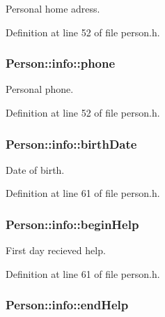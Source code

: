 Personal home adress. 



Definition at line 52 of file person.\+h.

\hypertarget{struct_person_1_1info_a07a8d88e73398595a0e0282eaffe9fef}{
\subsubsection[{phone}]{\setlength{\rightskip}{0pt plus 5cm}Person\+::info\+::phone}}\label{struct_person_1_1info_a07a8d88e73398595a0e0282eaffe9fef}


Personal phone. 



Definition at line 52 of file person.\+h.

\hypertarget{struct_person_1_1info_a803a2ee586aaa2503e10447b1435e916}{
\subsubsection[{birth\+Date}]{\setlength{\rightskip}{0pt plus 5cm}Person\+::info\+::birth\+Date}}\label{struct_person_1_1info_a803a2ee586aaa2503e10447b1435e916}


Date of birth. 



Definition at line 61 of file person.\+h.

\hypertarget{struct_person_1_1info_a835c907e641433331e06c62bcde9dfe9}{
\subsubsection[{begin\+Help}]{\setlength{\rightskip}{0pt plus 5cm}Person\+::info\+::begin\+Help}}\label{struct_person_1_1info_a835c907e641433331e06c62bcde9dfe9}


First day recieved help. 



Definition at line 61 of file person.\+h.

\hypertarget{struct_person_1_1info_acc738154c5e01adc22c880fc49d6e09c}{
\subsubsection[{end\+Help}]{\setlength{\rightskip}{0pt plus 5cm}Person\+::info\+::end\+Help}}\label{struct_person_1_1info_acc738154c5e01adc22c880fc49d6e09c}


